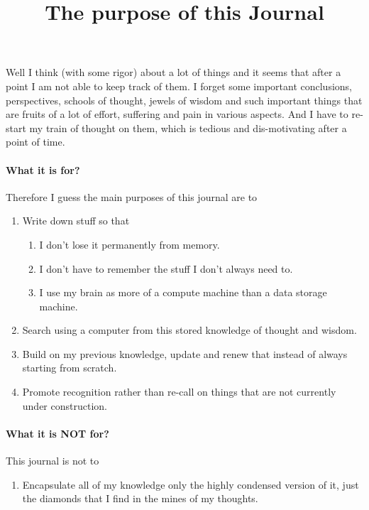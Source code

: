 \documentclass[12pt]{article}
\title{The purpose of this Journal}
\author{}
\begin{document}
\maketitle


Well I think (with some rigor) about a lot of things and it seems that after a point I am not able to keep track of them.
I forget some important conclusions, perspectives, schools of thought, jewels of wisdom and such important things that are fruits of a lot of effort, suffering and pain in various aspects.
And I have to re-start my train of thought on them, which is tedious and dis-motivating after a point of time.

\paragraph{What it is for?}
Therefore I guess the main purposes of this journal are to
\begin{enumerate}
  \item Write down stuff so that
    \begin{enumerate}
      \item I don't lose it permanently from memory.
      \item I don't have to remember the stuff I don't always need to.
      \item I use my brain as more of a compute machine than a data storage machine.
    \end{enumerate}
  \item Search using a computer from this stored knowledge of thought and wisdom.
  \item Build on my previous knowledge, update and renew that instead of always starting from scratch.
  \item Promote recognition rather than re-call on things that are not currently under construction.
\end{enumerate}

\paragraph{What it is NOT for?}
This journal is not to
\begin{enumerate}
  \item Encapsulate all of my knowledge only the highly condensed version of it, just the diamonds that I find in the mines of my thoughts.
\end{enumerate}
\end{document}
